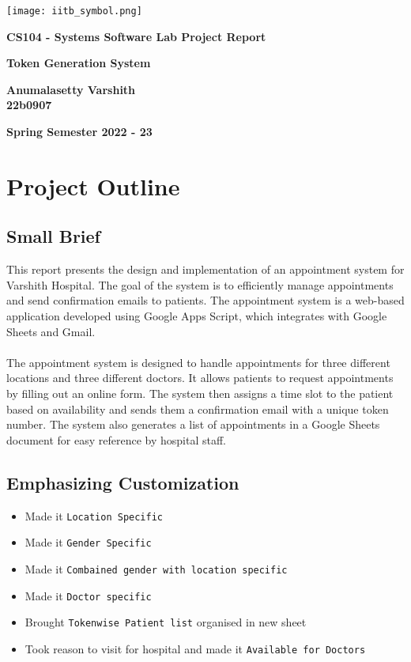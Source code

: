 \documentclass{report}
\renewcommand{\maketitle}{
  \begin{titlepage}
    \begin{center}
      \texttt{[image: iitb\_symbol.png]}
      \vspace{2cm}
      
      \Huge\textbf{CS104 - Systems Software Lab Project Report}
      
      \vspace{2cm}
      
      \Large\textbf{Token Generation System}
      
      \vspace{2cm}
      
      \Large\textbf{Anumalasetty Varshith \\ 22b0907 }
      
      \vfill
      
      \Large\textbf{Spring Semester 2022 - 23}
    \end{center}
  \end{titlepage}
}
\begin{document}
\begin{titlepage}
  \maketitle
\end{titlepage}

\tableofcontents

\clearpage


\chapter{Project Outline}
\section{Small Brief}
This report presents the design and implementation of an appointment system for Varshith Hospital. The goal of the system is to efficiently manage appointments and send confirmation emails to patients. The appointment system is a web-based application developed using Google Apps Script, which integrates with Google Sheets and Gmail. \\ \\

The appointment system is designed to handle appointments for three different
locations and three different doctors. It allows patients to request appointments
by filling out an online form. The system then assigns a time slot to the patient
based on availability and sends them a confirmation email with a unique token
number. The system also generates a list of appointments in a Google Sheets
document for easy reference by hospital staff.


\section{Emphasizing Customization}
\begin{itemize}
    \item Made it \texttt{Location Specific}
    \item Made it \texttt{Gender Specific}
    \item Made it \texttt{Combained gender with location specific}
    \item Made it \texttt{Doctor specific}
    \item Brought \texttt{Tokenwise Patient list} organised in new sheet
    \item Took reason to visit for hospital and made it \texttt{Available for Doctors}
\end{itemize}
\end{document}
